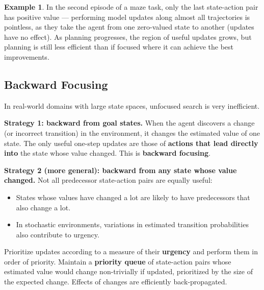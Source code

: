 \documentclass[11pt,a4paper]{article}
\theoremstyle{definition}
\newtheorem{example}{Example}[section]
\theoremstyle{plain}
\theoremstyle{remark}
\begin{document}
\begin{example}
In the second episode of a maze task, only the last state-action pair has positive value — performing model updates along almost all trajectories is pointless, as they take the agent from one zero-valued state to another (updates have no effect). As planning progresses, the region of useful updates grows, but planning is still less efficient than if focused where it can achieve the best improvements.
\end{example}

\subsection{Backward Focusing}

In real-world domains with large state spaces, unfocused search is very inefficient.

\textbf{Strategy 1: backward from goal states.} When the agent discovers a change (or incorrect transition) in the environment, it changes the estimated value of one state. The only useful one-step updates are those of \textbf{actions that lead directly into} the state whose value changed. This is \textbf{backward focusing}.

\textbf{Strategy 2 (more general): backward from any state whose value changed.} Not all predecessor state-action pairs are equally useful:
\begin{itemize}
    \item States whose values have changed a lot are likely to have predecessors that also change a lot.
    \item In stochastic environments, variations in estimated transition probabilities also contribute to urgency.
\end{itemize}

\begin{tcolorbox}[colback=blue!5!white, colframe=blue!60!black, title={Prioritized Sweeping}]
Prioritize updates according to a measure of their \textbf{urgency} and perform them in order of priority. Maintain a \textbf{priority queue} of state-action pairs whose estimated value would change non-trivially if updated, prioritized by the size of the expected change. Effects of changes are efficiently back-propagated.
\end{tcolorbox}
\end{document}
